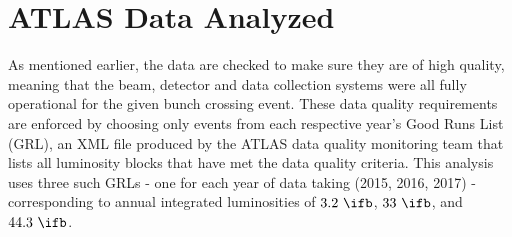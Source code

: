 \section{ATLAS Data Analyzed} \label{sec:data:data}

As mentioned earlier, the data are checked to make sure they are of high
quality, meaning that the beam, detector and data collection systems were all
fully operational for the given bunch crossing event. These data quality
requirements are enforced by choosing only events from each respective year's
Good Runs List (GRL), an XML file produced by the ATLAS data quality monitoring
team that lists all luminosity blocks that have met the data quality criteria.
This analysis uses three such GRLs - one for each year of data taking (2015,
2016, 2017) - corresponding to annual integrated luminosities of $3.2~\ifb$,
$33~\ifb$, and $44.3~\ifb$.
